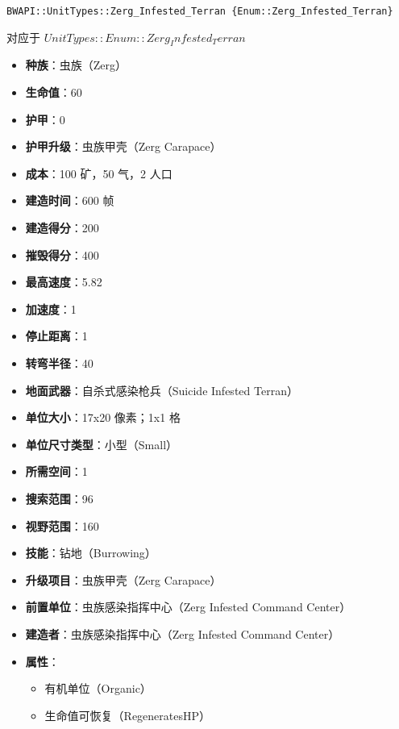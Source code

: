 \begin{tcolorbox}[colback=white, colframe=black!60!white, title=Zerg\_Infested\_Terran(), arc=0mm]
    \begin{verbatim}
BWAPI::UnitTypes::Zerg_Infested_Terran {Enum::Zerg_Infested_Terran}
    \end{verbatim}
    对应于  $ UnitTypes::Enum::Zerg_Infested_Terran $ 
    \begin{itemize}
        \item \textbf{种族}：虫族（Zerg）
        \item \textbf{生命值}：60
        \item \textbf{护甲}：0
        \item \textbf{护甲升级}：虫族甲壳（Zerg Carapace）
        \item \textbf{成本}：100 矿，50 气，2 人口
        \item \textbf{建造时间}：600 帧
        \item \textbf{建造得分}：200
        \item \textbf{摧毁得分}：400
        \item \textbf{最高速度}：5.82
        \item \textbf{加速度}：1
        \item \textbf{停止距离}：1
        \item \textbf{转弯半径}：40
        \item \textbf{地面武器}：自杀式感染枪兵（Suicide Infested Terran）
        \item \textbf{单位大小}：17x20 像素；1x1 格
        \item \textbf{单位尺寸类型}：小型（Small）
        \item \textbf{所需空间}：1
        \item \textbf{搜索范围}：96
        \item \textbf{视野范围}：160
        \item \textbf{技能}：钻地（Burrowing）
        \item \textbf{升级项目}：虫族甲壳（Zerg Carapace）
        \item \textbf{前置单位}：虫族感染指挥中心（Zerg Infested Command Center）
        \item \textbf{建造者}：虫族感染指挥中心（Zerg Infested Command Center）
        \item \textbf{属性}：
            \begin{itemize}
                \item 有机单位（Organic）
                \item 生命值可恢复（RegeneratesHP）
            \end{itemize}
    \end{itemize}
\end{tcolorbox}

